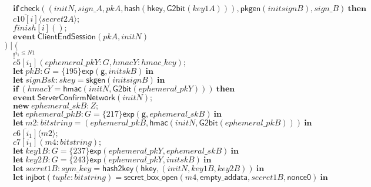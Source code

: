 \documentclass{article}
\newcommand{\cinput}[2]{{#1}({#2})}
\newcommand{\coutput}[2]{\overline{#1}\langle{#2}\rangle}
\newcommand{\kw}[1]{\mathbf{#1}}
\newcommand{\kwf}[1]{\mathsf{#1}}
\newcommand{\var}[1]{\mathit{#1}}
\newcommand{\kwt}[1]{\mathit{#1}}
\newcommand{\kwp}[1]{\mathit{#1}}
\newcommand{\kwc}[1]{\mathit{#1}}
\begin{document}
\begin{tabbing}
\>$\quad \kw{if}\ \kwf{check}(\kwf{}(\var{initN}, \var{sign{\_}A}, \var{pkA}, \kwf{hash}(\kwf{hkey}, \kwf{G2bit}(\var{key1A}))), \kwf{pkgen}(\var{initsignB}), \var{sign{\_}B})\ \kw{then}$\\
\>$\quad \coutput{\kwc{c10}[\var{i}]}{\var{secret2A}};$\\
\>$\quad \cinput{\kwc{finish}[\var{i}]}{};$\\
\>$\quad \kw{event}\ \kwf{ClientEndSession}(\var{pkA}, \var{initN})$\\
\>$) \mid ($\\
\>$\quad !^{\var{i}_{1} \leq \kwp{N1}}$\\
\>$\quad \cinput{\kwc{c5}[\var{i}_{1}]}{\var{ephemeral{\_}pkY}: \kwt{G}, \var{hmacY}: \kwt{hmac{\_}key}};$\\
\>$\quad \kw{let}\ \var{pkB}: \kwt{G} = \{195\}\kwf{exp}(\kwf{g}, \var{initskB})\ \kw{in}$\\
\>$\quad \kw{let}\ \var{signBsk}: \kwt{skey} = \kwf{skgen}(\var{initsignB})\ \kw{in}$\\
\>$\quad \kw{if}\ (\var{hmacY}  =  \kwf{hmac}(\var{initN}, \kwf{G2bit}(\var{ephemeral{\_}pkY})))\ \kw{then}$\\
\>$\quad \kw{event}\ \kwf{ServerConfirmNetwork}(\var{initN});$\\
\>$\quad \kw{new}\ \var{ephemeral{\_}skB}: \kwt{Z};$\\
\>$\quad \kw{let}\ \var{ephemeral{\_}pkB}: \kwt{G} = \{217\}\kwf{exp}(\kwf{g}, \var{ephemeral{\_}skB})\ \kw{in}$\\
\>$\quad \kw{let}\ \var{m2}: \kwt{bitstring} = \kwf{}(\var{ephemeral{\_}pkB}, \kwf{hmac}(\var{initN}, \kwf{G2bit}(\var{ephemeral{\_}pkB})))\ \kw{in}$\\
\>$\quad \coutput{\kwc{c6}[\var{i}_{1}]}{\var{m2}};$\\
\>$\quad \cinput{\kwc{c7}[\var{i}_{1}]}{\var{m4}: \kwt{bitstring}};$\\
\>$\quad \kw{let}\ \var{key1B}: \kwt{G} = \{237\}\kwf{exp}(\var{ephemeral{\_}pkY}, \var{ephemeral{\_}skB})\ \kw{in}$\\
\>$\quad \kw{let}\ \var{key2B}: \kwt{G} = \{243\}\kwf{exp}(\var{ephemeral{\_}pkY}, \var{initskB})\ \kw{in}$\\
\>$\quad \kw{let}\ \var{secret1B}: \kwt{sym{\_}key} = \kwf{hash2key}(\kwf{hkey}, \kwf{}(\var{initN}, \var{key1B}, \var{key2B}))\ \kw{in}$\\
\>$\quad \kw{let}\ \kwf{injbot}(\var{tuple}: \kwt{bitstring}) = \kwf{secret{\_}box{\_}open}(\var{m4}, \kwf{empty{\_}addata}, \var{secret1B}, \kwf{nonce0})\ \kw{in}$\\

\end{tabbing}
\end{document}
